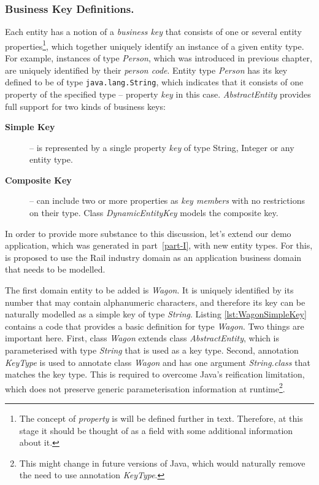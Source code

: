   \subsubsection*{Business Key Definitions.}
  Each entity has a notion of a \emph{business key} that consists of one or several entity properties\footnote{The concept of \emph{property} is will be defined further in text. Therefore, at this stage it should be thought of as a field with some additional information about it.}, which together uniquely identify an instance of a given entity type.
  For example, instances of type \emph{Person}, which was introduced in previous chapter, are uniquely identified by their \emph{person code}.
  Entity type \emph{Person} has its key defined to be of type \texttt{java.lang.String}, which indicates that it consists of one property of the specified type -- property \emph{key} in this case.
  \emph{AbstractEntity} provides full support for two kinds of business keys:
  \begin{description}
    \item[\textbf{Simple Key}] -- is represented by a single property \emph{key} of type String, Integer or any entity type.
    \item[\textbf{Composite Key}] -- can include two or more properties as \emph{key members} with no restrictions on their type. Class \emph{DynamicEntityKey} models the composite key.
   \end{description}

  In order to provide more substance to this discussion, let's extend our demo application, which was generated in part~\ref{part-I}, with new entity types.
  For this, is proposed to use the Rail industry domain as an application business domain that needs to be modelled.
  
  The first domain entity to be added is \emph{Wagon}.
  It is uniquely identified by its number that may contain alphanumeric characters, and therefore its key can be naturally modelled as a simple key of type \emph{String}.
  Listing \ref{lst:WagonSimpleKey} contains a code that provides a basic definition for type \emph{Wagon}.
  Two things are important here.
  First, class \emph{Wagon} extends class \emph{AbstractEntity}, which is parameterised with type \emph{String} that is used as a key type.
  Second, annotation \emph{KeyType} is used to annotate class \emph{Wagon} and has one argument \emph{String.class} that matches the key type.
  This is required to overcome Java's reification limitation, which does not preserve generic parameterisation information at runtime\footnote{This might change in future versions of Java, which would naturally remove the need to use annotation \emph{KeyType}.}.

